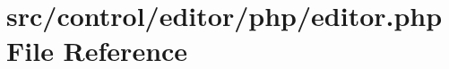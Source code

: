 \hypertarget{editor_8php}{}\section{src/control/editor/php/editor.php File Reference}
\label{editor_8php}
